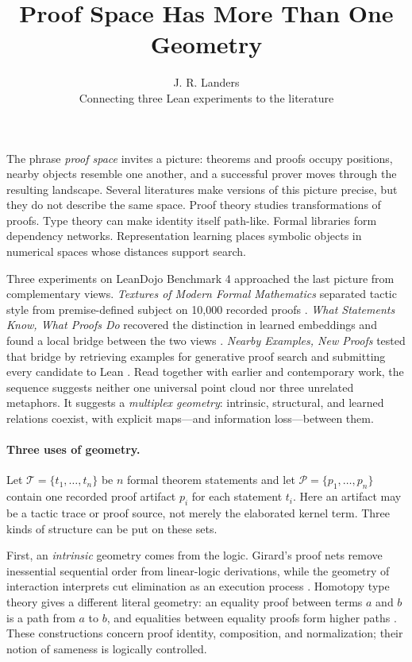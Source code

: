 \documentclass[11pt]{article}
\title{\vspace{-1.6em}\textbf{Proof Space Has More Than One Geometry}\vspace{-0.5em}}
\author{J. R. Landers\\[-1pt]\small Connecting three Lean experiments to the literature}
\date{\vspace{-1.2em}}
\begin{document}
\maketitle
\vspace{-1.6em}

The phrase \emph{proof space} invites a picture: theorems and proofs occupy positions, nearby
objects resemble one another, and a successful prover moves through the resulting landscape.
Several literatures make versions of this picture precise, but they do not describe the same
space.  Proof theory studies transformations of proofs.  Type theory can make identity itself
path-like.  Formal libraries form dependency networks.  Representation learning places symbolic
objects in numerical spaces whose distances support search.

Three experiments on LeanDojo Benchmark 4 approached the last picture from complementary views.
\emph{Textures of Modern Formal Mathematics} separated tactic style from premise-defined subject
on 10,000 recorded proofs \cite{textures}.  \emph{What Statements Know, What Proofs Do} recovered
the distinction in learned embeddings and found a local bridge between the two views
\cite{statements}.  \emph{Nearby Examples, New Proofs} tested that bridge by retrieving examples
for generative proof search and submitting every candidate to Lean \cite{nearby}.  Read together
with earlier and contemporary work, the sequence suggests neither one universal point cloud nor
three unrelated metaphors.  It suggests a \emph{multiplex geometry}: intrinsic, structural, and
learned relations coexist, with explicit maps---and information loss---between them.

\paragraph{Three uses of geometry.}
Let $\mathcal{T}=\{t_1,\ldots,t_n\}$ be $n$ formal theorem statements and let
$\mathcal{P}=\{p_1,\ldots,p_n\}$ contain one recorded proof artifact $p_i$ for each statement
$t_i$.  Here an artifact may be a tactic trace or proof source, not merely the elaborated kernel
term.  Three kinds of structure can be put on these sets.

First, an \emph{intrinsic} geometry comes from the logic.  Girard's proof nets remove inessential
sequential order from linear-logic derivations, while the geometry of interaction interprets
cut elimination as an execution process \cite{girard}.  Homotopy type theory gives a different
literal geometry: an equality proof between terms $a$ and $b$ is a path from $a$ to $b$, and
equalities between equality proofs form higher paths \cite{hott}.  These constructions concern
proof identity, composition, and normalization; their notion of sameness is logically controlled.
\end{document}
